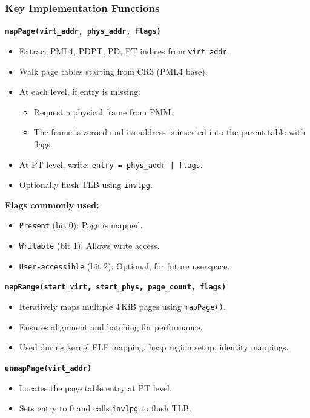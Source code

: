 \documentclass[12pt]{extarticle}
\begin{document}
\subsubsection*{Key Implementation Functions}

\vspace{0.5em}
\noindent\textbf{\texttt{mapPage(virt\_addr, phys\_addr, flags)}}
\begin{itemize}
  \item Extract PML4, PDPT, PD, PT indices from \texttt{virt\_addr}.
  \item Walk page tables starting from CR3 (PML4 base).
  \item At each level, if entry is missing:
  \begin{itemize}
    \item Request a physical frame from PMM.
    \item The frame is zeroed and its address is inserted into the parent table with flags.
  \end{itemize}
  \item At PT level, write:
  \texttt{entry = phys\_addr | flags}.
  \item Optionally flush TLB using \texttt{invlpg}.
\end{itemize}

\noindent\textbf{Flags commonly used:}
\begin{itemize}
  \item \texttt{Present} (bit 0): Page is mapped.
  \item \texttt{Writable} (bit 1): Allows write access.
  \item \texttt{User-accessible} (bit 2): Optional, for future userspace.
\end{itemize}

\vspace{0.5em}
\noindent\textbf{\texttt{mapRange(start\_virt, start\_phys, page\_count, flags)}}
\begin{itemize}
  \item Iteratively maps multiple 4\,KiB pages using \texttt{mapPage()}.
  \item Ensures alignment and batching for performance.
  \item Used during kernel ELF mapping, heap region setup, identity mappings.
\end{itemize}

\vspace{0.5em}
\noindent\textbf{\texttt{unmapPage(virt\_addr)}}
\begin{itemize}
  \item Locates the page table entry at PT level.
  \item Sets entry to 0 and calls \texttt{invlpg} to flush TLB.
\end{itemize}
\end{document}
